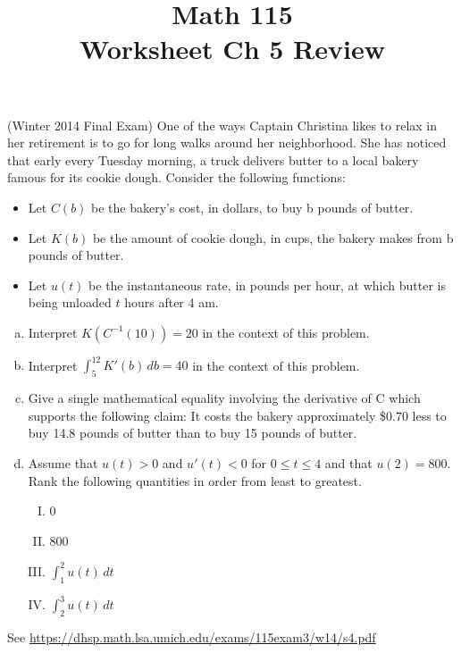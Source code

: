 \documentclass[11pt]{exam}
\title{\vspace{-0.5in} Math 115 \\ Worksheet Ch 5 Review}
\date{}
\begin{document}
\maketitle
\vspace{-0.75in}
\begin{questions}
  \question (Winter 2014 Final Exam) %
	One of the ways Captain Christina likes to relax in her retirement is to go for long walks around her neighborhood. She has noticed that early every Tuesday morning, a truck delivers butter to a local bakery famous for its cookie dough. Consider the following functions:
	\begin{itemize}
		\item Let $C(b)$ be the bakery's cost, in dollars, to buy b pounds of butter.
		\item Let $K(b)$ be the amount of cookie dough, in cups, the bakery makes from b pounds of butter.
		\item Let $u(t)$ be the instantaneous rate, in pounds per hour, at which butter is being unloaded $t$ hours after 4 am.
	\end{itemize}
\begin{enumerate}[(a)]
	\item Interpret $K(C^{-1}(10)) = 20$ in the context of this problem.
	\item Interpret $\displaystyle\int_5^{12} K'(b) \, db = 40$ in the context of this problem.
	\item Give a single mathematical equality involving the derivative of C which supports the following claim:
It costs the bakery approximately \$0.70 less to buy 14.8 pounds of butter than to buy 15 pounds of butter.
	\item Assume that $u(t)>0$ and $u'(t)<0$ for $0 \leqslant t \leqslant 4$ and that $u(2)=800$. Rank the following quantities in order from least to greatest.
	\begin{multicols}{4}
	\begin{enumerate}[I.]
	\item 0
	\item 800
	\item $\displaystyle\int_1^2 u(t) \, dt$
	\item $\displaystyle\int_2^3 u(t) \, dt$
	\end{enumerate} 
	\end{multicols}
\end{enumerate}
\begin{solution}
  See \href{https://dhsp.math.lsa.umich.edu/exams/115exam3/w14/s4.pdf}{https://dhsp.math.lsa.umich.edu/exams/115exam3/w14/s4.pdf}

\end{solution}
\end{questions}
\end{document}
